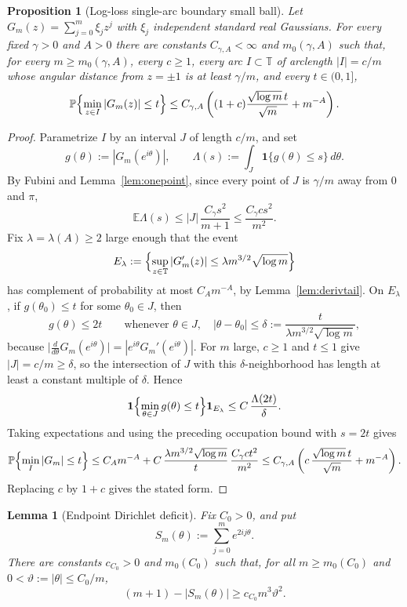 \documentclass[11pt]{amsart}
\numberwithin{equation}{section}
\newtheorem{proposition}[theorem]{Proposition}
\newtheorem{lemma}[theorem]{Lemma}
\theoremstyle{definition}
\theoremstyle{remark}
\newcommand{\T}{\mathbb T}
\newcommand{\Prob}{\mathbb P}
\newcommand{\Exp}{\mathbb E}
\newcommand{\abs}[1]{\left\lvert #1\right\rvert}
\begin{document}
\begin{proposition}[Log-loss single-arc boundary small ball]\label{prop:singlearc-log}
Let $G_m(z)=\sum_{j=0}^m\xi_jz^j$ with $\xi_j$ independent standard real Gaussians. For every fixed $\gamma>0$ and \(A>0\) there are constants \(C_{\gamma,A}<\infty\) and \(m_0(\gamma,A)\) such that, for every \(m\ge m_0(\gamma,A)\), every \(c\ge1\), every arc \(I\subset\T\) of arclength \(\abs I=c/m\) whose angular distance from \(z=\pm1\) is at least \(\gamma/m\), and every \(t\in(0,1]\),
\[
  \Prob\Bigl\{\min_{z\in I}\abs{G_m(z)}\le t\Bigr\}
  \le C_{\gamma,A}\left((1+c)\frac{\sqrt{\log m}\,t}{\sqrt m}+m^{-A}\right).
\]
\end{proposition}

\begin{proof}
Parametrize \(I\) by an interval \(J\) of length \(c/m\), and set
\[
  g(\theta):=\abs{G_m(e^{i\theta})},
  \qquad
  \Lambda(s):=\int_J \mathbf1\{g(\theta)\le s\}\,d\theta .
\]
By Fubini and Lemma~\ref{lem:onepoint}, since every point of \(J\) is \(\gamma/m\) away from \(0\) and \(\pi\),
\[
  \Exp\Lambda(s)
  \le \abs J\,\frac{C_\gamma s^2}{m+1}
  \le \frac{C_\gamma c s^2}{m^2}.
\]
Fix \(\lambda=\lambda(A)\ge2\) large enough that the event
\[
  E_\lambda:=\Bigl\{\sup_{z\in\T}\abs{G_m'(z)}
       \le \lambda m^{3/2}\sqrt{\log m}\Bigr\}
\]
has complement of probability at most \(C_A m^{-A}\), by Lemma~\ref{lem:derivtail}. On \(E_\lambda\), if \(g(\theta_0)\le t\) for some \(\theta_0\in J\), then
\[
  g(\theta)\le2t
  \qquad
  \text{whenever } \theta\in J,\quad
  \abs{\theta-\theta_0}\le
  \delta:=\frac{t}{\lambda m^{3/2}\sqrt{\log m}},
\]
because \(\bigl|\frac{d}{d\theta}G_m(e^{i\theta})\bigr|=\abs{e^{i\theta}G_m'(e^{i\theta})}\). For \(m\) large, \(c\ge1\) and \(t\le1\) give \(\abs J=c/m\ge\delta\), so the intersection of \(J\) with this \(\delta\)-neighborhood has length at least a constant multiple of \(\delta\). Hence
\[
  \mathbf1\Bigl\{\min_{\theta\in J}g(\theta)\le t\Bigr\}\mathbf1_{E_\lambda}
  \le C\,\frac{\Lambda(2t)}{\delta}.
\]
Taking expectations and using the preceding occupation bound with \(s=2t\) gives
\[
  \Prob\Bigl\{\min_I\abs{G_m}\le t\Bigr\}
  \le C_A m^{-A}
     + C\,\frac{\lambda m^{3/2}\sqrt{\log m}}{t}\,
       \frac{C_\gamma c t^2}{m^2}
  \le C_{\gamma,A}\left(c\,\frac{\sqrt{\log m}\,t}{\sqrt m}+m^{-A}\right).
\]
Replacing \(c\) by \(1+c\) gives the stated form.
\end{proof}

\begin{lemma}[Endpoint Dirichlet deficit]\label{lem:endpoint-dirichlet}
Fix \(C_0>0\), and put
\[
  S_m(\theta):=\sum_{j=0}^m e^{2ij\theta}.
\]
There are constants \(c_{C_0}>0\) and \(m_0(C_0)\) such that, for all
\(m\ge m_0(C_0)\) and \(0<\vartheta:=|\theta|\le C_0/m\),
\[
  (m+1)-|S_m(\theta)|\ge c_{C_0}m^3\vartheta^2.
\]
\end{lemma}
\end{document}
